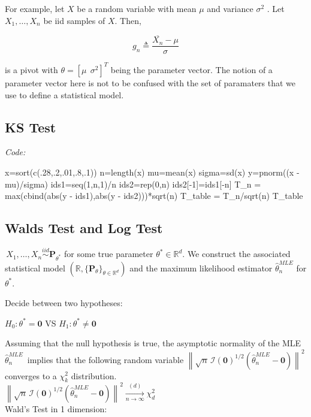 For example, let $X$ be a random variable with mean $\mu$ and variance $\sigma^2$ . Let $X_1,\dots ,X_ n$ be iid samples of $X$. Then,

$$\displaystyle  g_ n \triangleq \frac{\overline{X_ n} - \mu }{\sigma }$$
 		 	 
is a pivot with $\theta = \left[\mu ~ ~  \sigma ^2\right]^ T$ being the parameter vector. The notion of a parameter vector here is not to be confused with the set of paramaters that we use to define a statistical model. 			 
\subsection{KS Test}
\textit{Code: }
\begin{spverbatim}
x=sort(c(.28,.2,.01,.8,.1))
n=length(x)
mu=mean(x)
sigma=sd(x)
y=pnorm((x - mu)/sigma)
ids1=seq(1,n,1)/n
ids2=rep(0,n)
ids2[-1]=ids1[-n]
T_n = max(cbind(abs(y - ids1),abs(y - ids2)))*sqrt(n)
T_table = T_n/sqrt(n)
T_table
\end{spverbatim}

\subsection{Walds Test and Log Test}
$\, X_1, \ldots , X_ n \stackrel{iid}{\sim } \mathbf{P}_{\theta ^*}$  for some true parameter $\theta ^* \in \mathbb {R}^ d$. We construct the associated statistical model $(\mathbb {R}, \{  \mathbf{P}_\theta \} _{\theta \in \mathbb {R}^ d } )$ and the maximum likelihood estimator $\widehat{\theta }_ n^{MLE}$ for $\theta ^*$.

Decide between two hypotheses:

$H_0: \displaystyle  \theta ^* = \mathbf{0}$ VS $H_1: \displaystyle  \theta ^* \neq \mathbf{0}$

Assuming that the null hypothesis is true, the asymptotic normality of the MLE $\widehat{\theta }_ n^{MLE}\,$ implies that the following random variable $\left\lVert \sqrt{n}\, \mathcal{I}(\mathbf{0})^{1/2}(\widehat{\theta }_ n^{MLE}- \mathbf{0}) \right\rVert ^2$ converges to a $\chi ^2_ k$ distribution.\\

$\left\lVert \sqrt{n}\, \mathcal{I}(\mathbf{0})^{1/2}(\widehat{\theta }_ n^{MLE}- \mathbf{0}) \right\rVert ^2 \xrightarrow [n\to \infty ]{(d)} \chi ^2_ d\,$\\

Wald's Test in 1 dimension:\\

